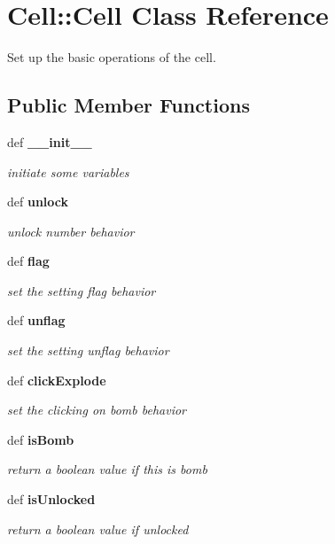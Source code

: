 \section{Cell::Cell Class Reference}
\label{classCell_1_1Cell}
Set up the basic operations of the cell.  


\subsection*{Public Member Functions}
\begin{CompactItemize}
\item 
def \bf{\_\-\_\-init\_\-\_\-}
\begin{CompactList}\small\item\em initiate some variables \item\end{CompactList}\item 
def \bf{unlock}
\begin{CompactList}\small\item\em unlock number behavior \item\end{CompactList}\item 
def \bf{flag}
\begin{CompactList}\small\item\em set the setting flag behavior \item\end{CompactList}\item 
def \bf{unflag}
\begin{CompactList}\small\item\em set the setting unflag behavior \item\end{CompactList}\item 
def \bf{click\-Explode}
\begin{CompactList}\small\item\em set the clicking on bomb behavior \item\end{CompactList}\item 
def \bf{is\-Bomb}
\begin{CompactList}\small\item\em return a boolean value if this is bomb \item\end{CompactList}\item 
def \bf{is\-Unlocked}
\begin{CompactList}\small\item\em return a boolean value if unlocked \item\end{CompactList}\item 

\end{CompactItemize}

